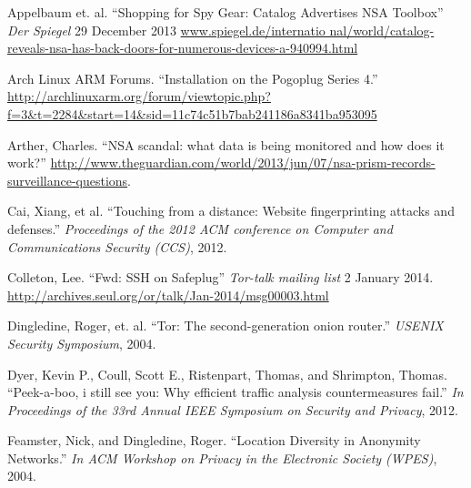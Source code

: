 \documentclass[conference]{IEEEtran}
\begin{document}

%
%
%
\begin{thebibliography}{1}

 Appelbaum et. al. ``Shopping for Spy Gear: Catalog Advertises 
NSA Toolbox'' \emph{Der Spiegel} 29 December 2013 \url{www.spiegel.de/internatio
nal/world/catalog-reveals-nsa-has-back-doors-for-numerous-devices-a-940994.html}

 Arch Linux ARM Forums. ``Installation on the Pogoplug Series 4.'' \url{http://archlinuxarm.org/forum/viewtopic.php?f=3&t=2284&start=14&sid=11c74c51b7bab241186a8341ba953095}

 Arther, Charles.  ``NSA scandal: what data is being monitored and how does it work?'' \url{http://www.theguardian.com/world/2013/jun/07/nsa-prism-records-surveillance-questions}.

 Cai, Xiang, et al. ``Touching from a distance: Website fingerprinting attacks and defenses.'' \emph{Proceedings of the 2012 ACM conference on Computer and Communications Security (CCS)}, 2012.

 Colleton, Lee. ``Fwd: SSH on Safeplug'' \emph{Tor-talk mailing list} 2 January 2014. \url{http://archives.seul.org/or/talk/Jan-2014/msg00003.html}

 Dingledine, Roger, et. al. ``Tor: The second-generation onion router.'' \emph{USENIX Security Symposium}, 2004.

 Dyer, Kevin P., Coull, Scott E., Ristenpart, Thomas, and Shrimpton, Thomas.  ``Peek-a-boo, i still see you: Why efficient traffic analysis countermeasures fail.'' \emph{In Proceedings of the 33rd Annual IEEE Symposium on Security and Privacy}, 2012.

 Feamster, Nick, and Dingledine, Roger.  ``Location Diversity in Anonymity Networks.''  \emph{In ACM Workshop on Privacy in the Electronic Society (WPES)}, 2004.


\end{thebibliography}
\end{document}
